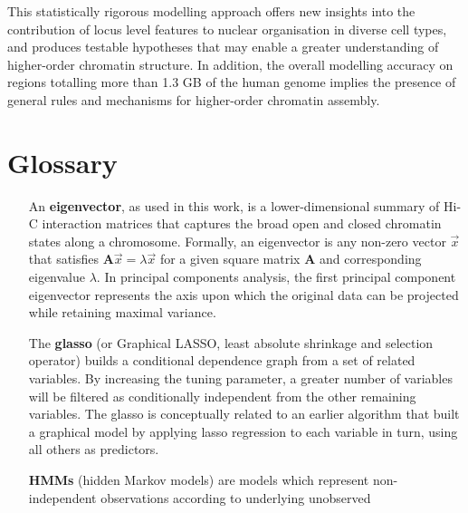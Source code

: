 \documentclass[a4paper]{report}
\begin{document}
This statistically rigorous modelling approach offers new insights
into the contribution of locus level features to nuclear organisation
in diverse cell types, and produces testable hypotheses that may
enable a greater understanding of higher-order chromatin structure. In
addition, the overall modelling accuracy on regions totalling more
than 1.3 GB of the human genome implies the presence of general rules and
mechanisms for higher-order chromatin assembly.

\clearpage

\chapter*{Glossary}
\vspace{-24pt}
\begin{itemize}
\item[An {\bf eigenvector},] as used in this work, is a lower-dimensional
  summary of Hi-C interaction matrices that captures the broad open
  and closed chromatin states along a chromosome. Formally, an eigenvector is any non-zero vector $\vec{x}$ that satisfies
  $\mathbf{A}\vec{x} = \lambda \vec{x}$ for a given square matrix
  $\mathbf{A}$ and corresponding eigenvalue $\lambda$. In principal
  components analysis, the first principal component eigenvector
  represents the axis upon which the original data can be projected
  while retaining maximal variance. 
\item[The {\bf glasso}] (or Graphical LASSO, least
  absolute shrinkage and selection operator) builds a conditional
  dependence graph from a set of related variables. By increasing
  the tuning parameter, a greater number of variables will be
  filtered as conditionally independent from the other remaining variables.
The glasso is conceptually related to an earlier algorithm\cite{Meinshausen2006} that built a
  graphical model by applying lasso regression to each variable in turn, using
  all others as predictors.
\item[{\bf HMMs}] (hidden Markov models) are models which represent
  non-independent observations according to underlying unobserved

\end{itemize}
\end{document}
